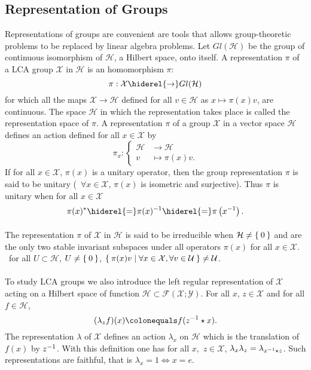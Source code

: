 \subsection{Representation of Groups}
Representations of groups are convenient are tools that allows group\--\-theo\-re\-tic problems to be replaced by linear algebra problems. Let $Gl(\mathcal{H})$ be the group of continuous isomorphism of $\mathcal{H}$, a Hilbert space, onto itself. A representation $\pi$ of a \ac{LCA} group $\mathcal{X}$ in $\mathcal{H}$ is an homomorphism $\pi$:
\begin{dmath*}
\pi:\mathcal{X}\hiderel{\to} Gl(\mathcal{H})
\end{dmath*}
for which all the maps $\mathcal{X}\to\mathcal{H}$ defined for all $v\in\mathcal{H}$ as $x\mapsto \pi(x)v$, are continuous. The space $\mathcal{H}$ in which the representation takes place
is called the representation space of $\pi$. A representation $\pi$ of a group $\mathcal{X}$ in a vector space $\mathcal{H}$ defines an action defined for all $x\in\mathcal{X}$ by
\begin{dmath*}
\pi_x:\begin{cases}
\mathcal{H}&\to\mathcal{H} \\
v &\mapsto \pi(x)v.
\end{cases}
\end{dmath*}
If for all $x\in\mathcal{X}$, $\pi(x)$ is a unitary operator, then the group representation $\pi$ is said to be unitary (\ie~$\forall x\in\mathcal{X}$, $\pi(x)$ is isometric and surjective). Thus $\pi$ is unitary when for all $x\in\mathcal{X}$
\begin{dmath*}
\pi(x)^*\hiderel{=}\pi(x)^{-1}\hiderel{=}\pi\left(x^{-1}\right).
\end{dmath*}
\paragraph{}
The representation $\pi$ of $\mathcal{X}$ in $\mathcal{H}$ is said to be irreducible when $\mathcal{H}\neq \Set{0}$ and are the only two stable invariant subspaces under all operators $\pi(x)$ for all $x\in\mathcal{X}$. \Ie~for all $ U\subset\mathcal{H}$, $U\neq \Set{0}$, $\Set{\pi(x)v|\forall x\in\mathcal{X},\forall v\in\mathcal{U}}\neq \mathcal{U}$.
\paragraph{}
To study \ac{LCA} groups we also introduce the left regular representation of $\mathcal{X}$ acting on a Hilbert space of function $\mathcal{H}\subset\mathcal{F}(\mathcal{X};\mathcal{Y})$. For all $x$, $z\in\mathcal{X}$ and for all $f\in\mathcal{H}$,
\begin{dmath*}
(\lambda_z f)(x)\colonequals f(\inv{z}\groupop x).
\end{dmath*}
The representation $\lambda$ of $\mathcal{X}$ defines an action $\lambda_x$ on $\mathcal{H}$ which is the translation of $f(x)$ by ${z}^{-1}$. With this definition one has for all $x,$ $z\in\mathcal{X}$, $\lambda_x\lambda_z=\lambda_{{x}^{-1}\star z}$. Such representations are faithful, that is $\lambda_x=1 \iff x=e$.

